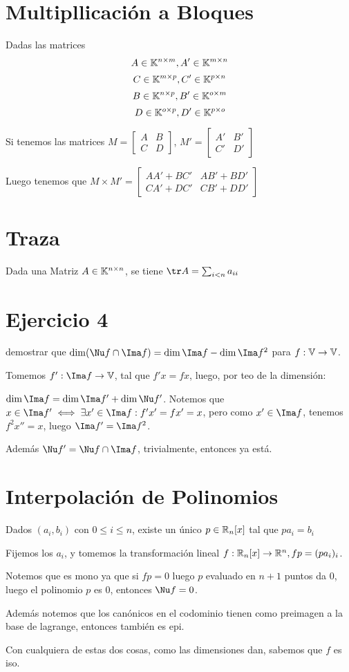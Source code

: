 \documentclass{article}
\begin{document}
\section{Multipllicación a Bloques}

Dadas las matrices
\[A \in \mathbb{K}^{n \times m}, A' \in \mathbb{K}^{m \times n}\]
\[C \in \mathbb{K}^{m \times p}, C' \in \mathbb{K} ^ {p \times n}\]
\[B \in \mathbb{K}^{n \times p}, B' \in \mathbb{K}^{o \times m}\]
\[D \in \mathbb{K}^{o \times p}, D' \in \mathbb{K}^{p \times o}\]

	Si tenemos las matrices $M = 
	\begin{bmatrix}
		A & B \\
		C & D
	\end{bmatrix}$, $
	M' = 
	\begin{bmatrix}
		A' & B' \\
		C' & D'
	\end{bmatrix}
	$

	Luego tenemos que $M \times M' =
	\begin{bmatrix}
		A A' + B C' & A B' + B D' \\
		CA' + DC' & CB' + DD'
	\end{bmatrix}
	$

\section{Traza}
Dada una Matriz $A \in \mathbb{K}^{n \times n}$, se tiene $\tr A = \sum_{i < n} a_{ii}$

\section{Ejercicio 4}
demostrar que $\dim (\Nu f \cap \Ima f) = \dim \Ima f - \dim \Ima f^2$ para $f : \mathbb{V} \to \mathbb{V}$.


Tomemos $f' : \Ima f \to \V$, tal que $f' x = fx$, luego, por teo de la dimensión:

$\dim \Ima f = \dim \Ima f' + \dim \Nu f'$. Notemos que $x \in \Ima f' \iff \exists x' \in
\Ima f : f' x' = f x' = x$, pero como $x' \in \Ima f$, tenemos $f^2 x'' = x$, luego
$\Ima f' = \Ima f^2$.

Además $\Nu f' = \Nu f \cap \Ima f$, trivialmente, entonces ya está.

\section{Interpolación de Polinomios}
Dados $(a_i, b_i)$ con $0 \leq i \leq n$, existe un único $p \in \mathbb{R}_n[x]$ tal que
$pa_i = b_i$

Fijemos los $a_i$, y tomemos
la transformación lineal $f : \mathbb{R}_n[x] \to \mathbb{R}^n, f p = (p a_i)_i$.

Notemos que es mono ya que si $fp = 0$ luego $p$ evaluado en $n+1$ puntos da $0$,
luego el polinomio $p$ es $0$, entonces $\Nu f = 0$.

Además notemos que los canónicos en el codominio tienen como preimagen a la base de
lagrange, entonces también es epi.

Con cualquiera de estas dos cosas, como las dimensiones dan, sabemos que $f$ es iso.
\end{document}
